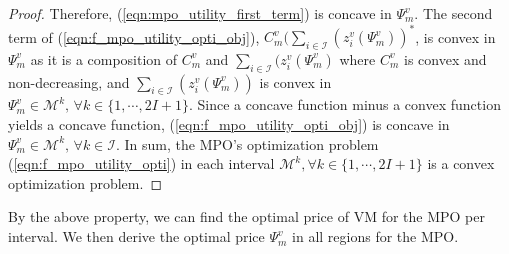 \documentclass[conference]{IEEEtran}
\begin{document}
\begin{proof}
Therefore, (\ref{eqn:mpo_utility_first_term}) is concave in $\Psi_m^v$. The second term of (\ref{eqn:f_mpo_utility_opti_obj}), $C_m^v\big(\sum_{i \in \mathcal{I}} (z_{i}^v(\Psi_m^v))^*$, is convex in $\Psi_m^v$ as it is a composition of $C_m^v$ and $\sum_{i \in \mathcal{I}} (z_{i}^v(\Psi_m^v)$ where $C_m^v$ is convex and non-decreasing, and $\sum_{i \in \mathcal{I}} (z_{i}^v(\Psi_m^v))$ is convex in $\Psi_m^v \in \mathcal{M}^k,\, \forall k \in \{1, \cdots, 2I+1\}$. Since a concave function minus a convex function yields a concave function, (\ref{eqn:f_mpo_utility_opti_obj}) is concave in $\Psi_m^v \in \mathcal{M}^k,\, \forall k \in \mathcal{I}$. In sum, the MPO's optimization problem (\ref{eqn:f_mpo_utility_opti}) in each interval $\mathcal{M}^k, \forall k \in \{1, \cdots, 2I+1\}$ is a convex optimization problem. \qedhere
\end{proof}
\fi
 
By the above property, we can find the optimal price of VM for the MPO per interval. We then derive the optimal price $\Psi_m^v$ in all regions for the MPO.
\end{document}
